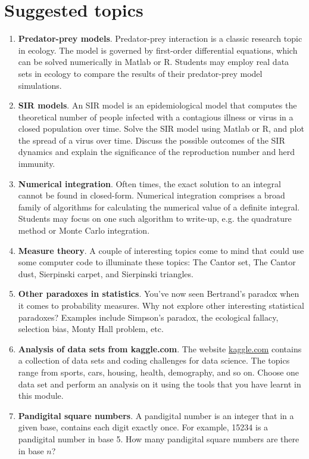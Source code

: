 \documentclass[a4paper,margins=1in]{article}
\begin{document}
\section*{Suggested topics}

\begin{enumerate}
    \item \textbf{Predator-prey models}. Predator-prey interaction is a classic research topic in ecology. The model is governed by first-order differential equations, which can be solved numerically in Matlab or R. Students may employ real data sets in ecology to compare the results of their predator-prey model simulations.
    \item \textbf{SIR models}. An SIR model is an epidemiological model that computes the theoretical number of people infected with a contagious illness or virus in a closed population over time. Solve the SIR model using Matlab or R, and plot the spread of a virus over time. Discuss the possible outcomes of the SIR dynamics and explain the significance of the reproduction number and herd immunity.
    \item \textbf{Numerical integration}. Often times, the exact solution to an integral cannot be found in closed-form. Numerical integration comprises a broad family of algorithms for calculating the numerical value of a definite integral. Students may focus on one such algorithm to write-up, e.g. the quadrature method or Monte Carlo integration.
    \item \textbf{Measure theory}. A couple of interesting topics come to mind that could use some computer code to illuminate these topics: The Cantor set, The Cantor dust, Sierpinski carpet, and Sierpinski triangles.
    \item \textbf{Other paradoxes in statistics}. You've now seen Bertrand's paradox when it comes to probability measures. Why not explore other interesting statistical paradoxes? Examples include Simpson's paradox, the ecological fallacy, selection bias, Monty Hall problem, etc.
    \item \textbf{Analysis of data sets from kaggle.com}. The website \url{kaggle.com} contains a collection of data sets and coding challenges for data science. The topics range from sports, cars, housing, health, demography, and so on. Choose one data set and perform an analysis on it using the tools that you have learnt in this module.
    \item \textbf{Pandigital square numbers}. A pandigital number is an integer that in a given base, contains each digit exactly once. For example, 15234 is a pandigital number in base 5. How many pandigital square numbers are there in base $n$?

\end{enumerate}
\end{document}
